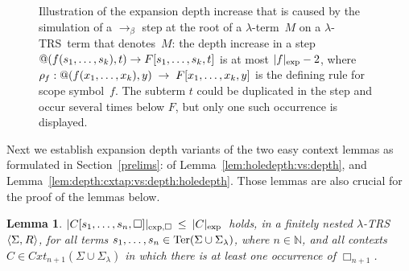 \documentclass[
submission
]{dmtcs-episciences-tampered}
\makeatletter
\newcommand{\funin}{\mathrel{:}}
\newcommand{\fap}[2]{#1({#2})}
\newcommand{\bfap}[3]{{#1}({#2},\hspace*{0.05pt}{#3})}
\newcommand{\iap}[2]{#1 _{#2}}
\newcommand{\indap}[2]{#1 _{#2}}
\newcommand{\subap}[2]{#1 _{#2}}
\newcommand{\bap}{\subap}
\newcommand{\nb}{\nobreakdash}
\newcommand{\nf}{\normalfont}
\newcommand{\tuple}[1]{\langle #1 \rangle}
\newcommand{\tuplespace}{\hspace*{0.5pt}}
\newcommand{\pair}[2]{\tuple{#1, \tuplespace #2}}
\newcommand{\nat}{\mathbb{N}}
\newcommand{\avar}{x}
\newcommand{\bvar}{y}
\newcommand{\avari}{\indap{\avar}}
\newcommand{\ater}{s}
\newcommand{\bter}{t}
\newcommand{\ateri}{\indap{\ater}}
\newcommand{\asig}{\Sigma}
\newcommand{\asiglambda}{\indap{\asig}{\lambda}}
\newcommand{\arules}{R}
\newcommand{\TRS}{TRS}
\newcommand{\stermsover}{\text{\nf Ter}}
\newcommand{\termsover}{\fap{\stermsover}}
\newcommand{\scontextsover}{\textit{Cxt}}
\newcommand{\scontextsnover}{\bap{\scontextsover}}
\newcommand{\contextsnover}[1]{\fap{\scontextsnover{#1}}}
\newcommand{\sfolapp}{@}
\newcommand{\folapp}{\bfap{\sfolapp}}
\newcommand{\afoscopesym}{f}
\newcommand{\afoscope}{\fap{\afoscopesym}}
\newcommand{\cxtap}[2]{{#1}[#2]}
\newcommand{\acxt}{C}
\newcommand{\acxtap}{\cxtap{\acxt}}
\newcommand{\afoscopecxt}{F}
\newcommand{\afoscopecxtap}{\cxtap{\afoscopecxt}}
\newcommand{\hole}{\Box}
\newcommand{\holei}{\iap{\hole}}
\newcommand{\ruleof}[1]{\indap{\rho}{\hspace*{-0.3pt}#1}}
\newcommand{\expdepth}[1]{\lvert{#1}\rvert_{\scriptexp}}
\newcommand{\expholedepth}[1]{\lvert{#1}\rvert_{\scriptexp,\hole}}
\newcommand{\alter}{M}
\newcommand{\sred}{\to}
\newcommand{\red}{\mathrel{\sred}}
\newcommand{\scriptexp}{\text{\nf exp}}
\newcommand{\sbetared}{\sred_{\beta}}
\newcommand{\lambdaterm}{$\lambda$\nb-term}
\newcommand{\lTRS}{$\lambda$\hspace*{-0.5pt}\nb-\hspace*{-0.5pt}\TRS}
\theoremstyle{plain}
\newtheorem{lemma}[theorem]{Lemma}
\theoremstyle{definition}
\makeatother
\begin{document}
\begin{figure}
\begin{center}
\begin{tikzpicture}
    
  \end{tikzpicture}
\end{center}
    \vspace*{-2.5ex}
  \caption{\label{fig:depth:increase}
    Illustration of the expansion depth increase that is caused by the simulation
    of a $\sbetared$ step at the root of a \lambdaterm~$\alter$
    on a \protect\lTRS\ term that denotes~$\alter$:
    the depth increase in a step
    $\folapp{\afoscope{\ateri{1},\ldots,\ateri{k}}}{\bter} \red \afoscopecxtap{\ateri{1},\ldots,\ateri{k},\bter}$
    is at most $\expdepth{\afoscopesym} - 2$, where
    $\ruleof{\afoscopesym} \funin
     \folapp{\afoscope{\avari{1},\ldots,\avari{k}}}{\bvar}
       \;\sred\;
     \afoscopecxtap{\avari{1},\ldots,\avari{k},\bvar}$
    is the defining rule for scope symbol~$\afoscopesym$.
    The subterm $\bter$ could be duplicated in the step and occur several times below $\afoscopecxt$,
    but only one such occurrence is displayed.
    }
\end{figure}



Next we establish expansion depth variants of the two easy context lemmas
as formulated in Section~\ref{prelims}:
of Lemma~\ref{lem:holedepth:vs:depth}, and Lemma~\ref{lem:depth:cxtap:vs:depth:holedepth}.
Those lemmas are also crucial for the proof of the lemmas below.


\begin{lemma}
  $\expholedepth{ \acxtap{\ateri{1},\ldots,\ateri{n},\Box} } \:\le\: \expdepth{\acxt}\:$
  holds, in a finitely nested \lTRS~$\pair{\asig}{\arules}$, 
  for all terms $\ateri{1},\ldots,\ateri{n}\in\termsover{\asig\cup\asiglambda}$,
  where $n\in\nat$,
  and all contexts $\acxt\in\contextsnover{n+1}{\asig\cup\asiglambda}$
  in which there is at least one occurrence of $\holei{n+1}$.   
    \label{lem:expholedepth:vs:expdepth} 
\end{lemma}
\end{document}
